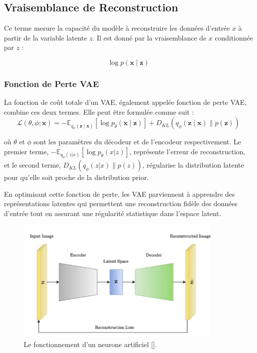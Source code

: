 \subsection*{Vraisemblance de Reconstruction}

Ce terme mesure la capacité du modèle à reconstruire les données d'entrée \( x
\) à partir de la variable latente \( z \). Il est donné par la vraisemblance
de \( x \) conditionnée par \( z \) :

\begin{equation}
    \log p(\mathbf{x} \mid \mathbf{z})
\end{equation}

\subsubsection*{Fonction de Perte VAE}

La fonction de coût totale d'un VAE, également appelée fonction de perte VAE,
combine ces deux termes. Elle peut être formulée comme suit :
\begin{equation}
    \mathcal{L}(\theta, \phi; \mathbf{x}) = - \mathbb{E}_{q_\phi(\mathbf{z} \mid \mathbf{x})}[\log p_\theta(\mathbf{x} \mid \mathbf{z})] + D_{KL}(q_\phi(\mathbf{z} \mid \mathbf{x}) \parallel p(\mathbf{z}))
\end{equation}

où \( \theta \) et \( \phi \) sont les paramètres du décodeur et de l'encodeur
respectivement. Le premier terme, \( - \mathbb{E}_{q_\phi(z | x)}[\log
	p_\theta(x | z)] \), représente l'erreur de reconstruction, et le second terme,
\( D_{KL}(q_\phi(z | x) \parallel p(z)) \), régularise la distribution latente
pour qu'elle soit proche de la distribution prior.

En optimisant cette fonction de perte, les VAE parviennent à apprendre des
représentations latentes qui permettent une reconstruction fidèle des données
d'entrée tout en assurant une régularité statistique dans l'espace latent.

\begin{figure}[hbt!]
	\centering
	\includegraphics[width=10cm]{images_pfe/vae_1.png}
	\caption{Le fonctionnement d'un neurone artificiel [\cite{kingma_welling_auto_encoding}].}
	\label{fig:VAE}
\end{figure}

